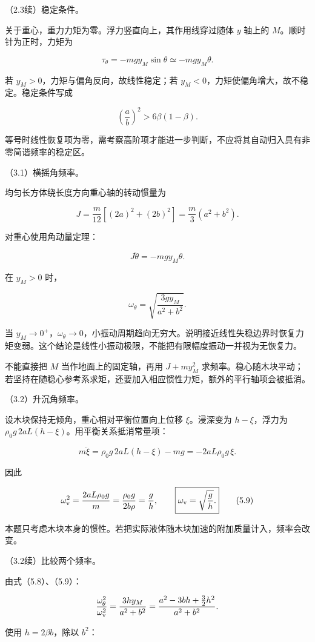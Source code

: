 \documentclass[12pt,a4paper,fontset=fandol]{ctexart}
\begin{document}
（2.3续）稳定条件。

关于重心，重力力矩为零。浮力竖直向上，其作用线穿过随体 \(y\) 轴上的
\(M\)。顺时针为正时，力矩为

\[
\tau_\theta=-mgy_M\sin\theta\simeq-mgy_M\theta.
\tag{5.6}
\]

若 \(y_M>0\)，力矩与偏角反向，故线性稳定；若
\(y_M<0\)，力矩使偏角增大，故不稳定。稳定条件写成

\[
\boxed{\left(\frac ab\right)^2>6\beta(1-\beta).}
\tag{5.7}
\]

等号时线性恢复项为零，需考察高阶项才能进一步判断，不应将其自动归入具有非零简谐频率的稳定区。

（3.1）横摇角频率。

均匀长方体绕长度方向重心轴的转动惯量为

\[
J=\frac{m}{12}[(2a)^2+(2b)^2]
=\frac m3(a^2+b^2).
\]

对重心使用角动量定理：

\[
J\ddot\theta=-mgy_M\theta.
\]

在 \(y_M>0\) 时，

\[
\boxed{\omega_\theta=\sqrt{\frac{3gy_M}{a^2+b^2}}.}
\tag{5.8}
\]

当
\(y_M\to0^+\)，\(\omega_\theta\to0\)，小振动周期趋向无穷大。说明接近线性失稳边界时恢复力矩变弱。这个结论是线性小振动极限，不能把有限幅度振动一并视为无恢复力。

不能直接把 \(M\) 当作地面上的固定轴，再用 \(J+my_M^2\)
求频率。稳心随木块平动；若坚持在随稳心参考系求矩，还要加入相应惯性力矩，额外的平行轴项会被抵消。

（3.2）升沉角频率。

设木块保持无倾角，重心相对平衡位置向上位移 \(\xi\)。浸深变为
\(h-\xi\)，浮力为 \(\rho_0g\,2aL(h-\xi)\)。用平衡关系抵消常量项：

\[
m\ddot\xi=\rho_0g\,2aL(h-\xi)-mg
=-2aL\rho_0g\,\xi.
\]

因此

\[
\omega_{\rm v}^2=\frac{2aL\rho_0g}{m}
=\frac{\rho_0g}{2b\rho}=\frac gh,
\qquad
\boxed{\omega_{\rm v}=\sqrt{\frac gh}.}
\tag{5.9}
\]

本题只考虑木块本身的惯性。若把实际液体随木块加速的附加质量计入，频率会改变。

（3.2续）比较两个频率。

由式（5.8）、（5.9）：

\[
\frac{\omega_\theta^2}{\omega_{\rm v}^2}
=\frac{3hy_M}{a^2+b^2}
=\frac{a^2-3bh+\frac32h^2}{a^2+b^2}.
\]

使用 \(h=2\beta b\)，除以 \(b^2\)：
\end{document}
